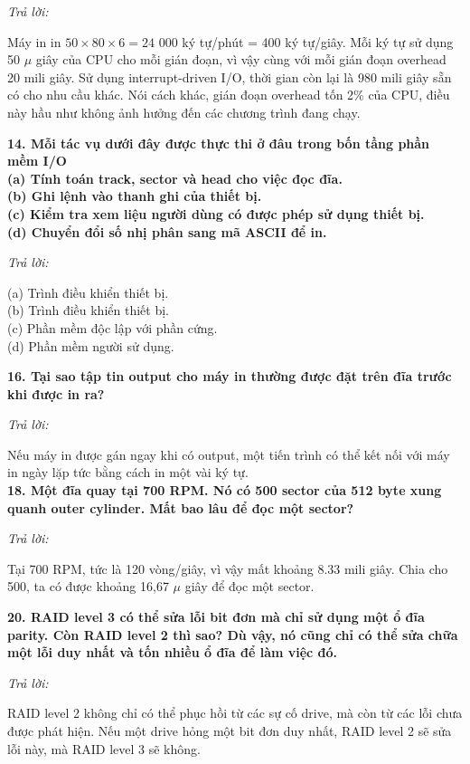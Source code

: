 \documentclass{report}
\begin{document}
\bigskip
\textit{Trả lời:}

\smallskip
Máy in in $50 \times 80 \times 6 = 24$ 000 ký tự/phút = 400 ký tự/giây. Mỗi ký tự sử dụng 50 $\mu$ giây của CPU cho mỗi gián đoạn, vì vậy cùng với mỗi gián đoạn overhead 20 mili giây. Sử dụng interrupt-driven I/O, thời gian còn lại là 980 mili giây sẵn có cho nhu cầu khác. Nói cách khác, gián đoạn overhead tốn 2\% của CPU, điều này hầu như không ảnh hưởng đến các chương trình đang chạy.

\bigskip
\textbf{14. Mỗi tác vụ dưới đây được thực thi ở đâu trong bốn tầng phần mềm I/O\\
(a) Tính toán track, sector và head cho việc đọc đĩa.\\
(b) Ghi lệnh vào thanh ghi của thiết bị.\\
(c)	Kiểm tra xem liệu người dùng có được phép sử dụng thiết bị.\\
(d) Chuyển đổi số nhị phân sang mã ASCII để in.}

\bigskip
\textit{Trả lời:}

\smallskip
(a) Trình điều khiển thiết bị.\\
(b) Trình điều khiển thiết bị.\\
(c) Phần mềm độc lập với phần cứng.\\
(d) Phần mềm người sử dụng.

\bigskip
\textbf{16. Tại sao tập tin output cho máy in thường được đặt trên đĩa trước khi được in ra?}

\bigskip
\textit{Trả lời:}

\smallskip
Nếu máy in được gán ngay khi có output, một tiến trình có thể kết nối với máy in ngày lặp tức bằng cách in một vài ký tự.\\

\bigskip
\textbf{18. Một đĩa quay tại 700 RPM. Nó có 500 sector của 512 byte xung quanh outer cylinder. Mất bao lâu để đọc một sector?}

\bigskip
\textit{Trả lời:}

\smallskip
Tại 700 RPM, tức là 120 vòng/giây, vì vậy mất khoảng 8.33 mili giây. Chia cho 500, ta có được khoảng 16,67 $\mu$ giây để đọc một sector.

\bigskip
\textbf{20. RAID level 3 có thể sửa lỗi bit đơn mà chỉ sử dụng một ổ đĩa parity. Còn RAID level 2 thì sao? Dù vậy, nó cũng chỉ có thể sửa chữa một lỗi duy nhất và tốn nhiều ổ đĩa để làm việc đó.}

\bigskip
\textit{Trả lời:}

\smallskip
RAID level 2 không chỉ có thể phục hồi từ các sự cố drive, mà còn từ các lỗi chưa được phát hiện. Nếu một drive hỏng một bit đơn duy nhất, RAID level 2 sẽ sửa lỗi này, mà RAID level 3 sẽ không.
\end{document}
